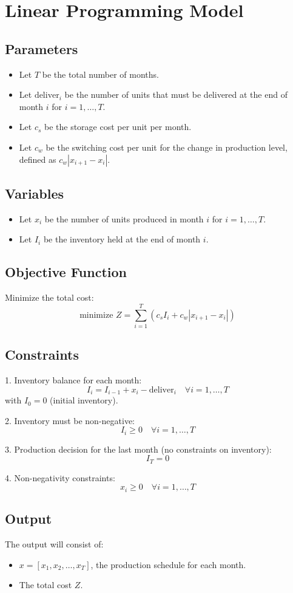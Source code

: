 \documentclass{article}
\begin{document}
\section*{Linear Programming Model}

\subsection*{Parameters}
\begin{itemize}
    \item Let $T$ be the total number of months.
    \item Let $\text{deliver}_i$ be the number of units that must be delivered at the end of month $i$ for $i = 1, \ldots, T$.
    \item Let $c_s$ be the storage cost per unit per month.
    \item Let $c_w$ be the switching cost per unit for the change in production level, defined as $c_w |x_{i+1} - x_i|$.
\end{itemize}

\subsection*{Variables}
\begin{itemize}
    \item Let $x_i$ be the number of units produced in month $i$ for $i = 1, \ldots, T$.
    \item Let $I_i$ be the inventory held at the end of month $i$.
\end{itemize}

\subsection*{Objective Function}
Minimize the total cost:
\[
\text{minimize } Z = \sum_{i=1}^{T} \left( c_s I_i + c_w |x_{i+1} - x_i| \right)
\]

\subsection*{Constraints}
1. Inventory balance for each month:
   \[
   I_i = I_{i-1} + x_i - \text{deliver}_i \quad \forall i = 1, \ldots, T
   \]
   with $I_0 = 0$ (initial inventory).

2. Inventory must be non-negative:
   \[
   I_i \geq 0 \quad \forall i = 1, \ldots, T
   \]

3. Production decision for the last month (no constraints on inventory):
   \[
   I_T = 0
   \]

4. Non-negativity constraints:
   \[
   x_i \geq 0 \quad \forall i = 1, \ldots, T
   \]
   
\subsection*{Output}
The output will consist of:
\begin{itemize}
    \item $x = [x_1, x_2, \ldots, x_T]$, the production schedule for each month.
    \item The total cost $Z$.
\end{itemize}
\end{document}
